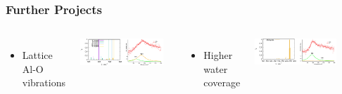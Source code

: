 \documentclass[hyperref={pdfpagelabels=false}]{beamer}
\begin{document}
\begin{frame}
 \frametitle{Further Projects}
 \begin{columns}
 \begin{itemize}
  \item Lattice Al-O vibrations %
 \end{itemize}
 \includegraphics[width=0.9\textwidth]{figures/clean-surf-spectra.png}
 \begin{itemize}
 \item Higher water coverage
\end{itemize}
 \includegraphics[width=0.9\textwidth]{figures/fully-cov-spectra.png}
 \begin{center}

\end{center}
\end{columns}
\end{frame}
\end{document}
